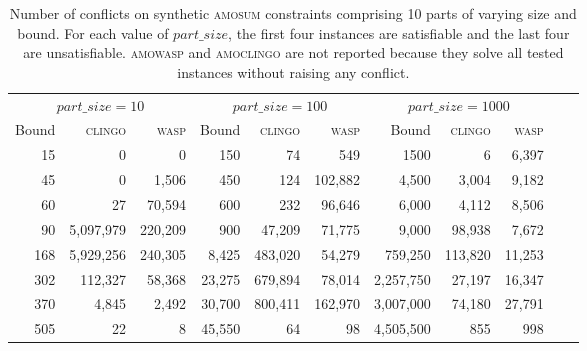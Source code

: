 \documentclass[preprint,authoryear]{elsarticle}
\theoremstyle{definition}
\begin{document}
\begin{table}[t!]
    \centering
    \small
    \setlength{\tabcolsep}{4pt}
    
\begin{tabular}{rrr r rrr r rrr}
        \toprule
        \multicolumn{3}{c}{$\mathit{part\_size}=10$} &
        \multicolumn{3}{c}{$\mathit{part\_size}=100$} &
        \multicolumn{3}{c}{$\mathit{part\_size}=1000$} \\
        \cmidrule(lr){1-3}
        \cmidrule(lr){4-6}
        \cmidrule(lr){7-9}
        Bound & \textsc{clingo} & \textsc{wasp}
        & Bound & \textsc{clingo} & \textsc{wasp}
        & Bound & \textsc{clingo} & \textsc{wasp} \\
        \midrule
        15 & 0         & 0
        & 150 & 74        & 549
        & 1500 & 6  & 6,397 \\

        45 & 0         & 1,506
        & 450 & 124       & 102,882
        & 4,500 & 3,004  & 9,182 \\

        60        & 27 & 70,594
        & 600 & 232       & 96,646
        & 6,000 & 4,112 & 8,506 \\

        90 & 5,097,979 & 220,209
        & 900 & 47,209    & 71,775
        & 9,000 & 98,938  & 7,672 \\
        \midrule
        168 & 5,929,256 & 240,305
        & 8,425 & 483,020 & 54,279
        & 759,250 & 113,820 & 11,253 \\

        302 & 112,327   & 58,368
        & 23,275 & 679,894 & 78,014
        & 2,257,750 & 27,197 & 16,347 \\

        370 & 4,845     & 2,492
        & 30,700 & 800,411 & 162,970
        & 3,007,000 & 74,180 & 27,791 \\

        505 & 22        & 8
        & 45,550 & 64      & 98
        & 4,505,500 & 855    & 998 \\
        \bottomrule
    \end{tabular}


    \caption{
        Number of conflicts on synthetic \textsc{amosum} constraints
        comprising 10 parts of varying size and bound.
        For each value of $\mathit{part\_size}$, the first four instances
        are satisfiable and the last four are unsatisfiable.
        \textsc{amowasp} and \textsc{amoclingo} are not reported because
        they solve all tested instances without raising any conflict.
    }
    \label{tab:resultssynthetic}
\end{table}
\end{document}
